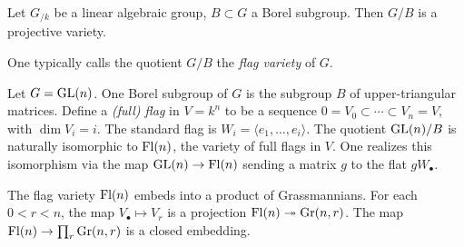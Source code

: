 \begin{theorem}
Let $G_{/k}$ be a linear algebraic group, $B\subset G$ a Borel subgroup. Then 
$G/B$ is a projective variety. 
\end{theorem}

One typically calls the quotient $G/B$ the \emph{flag variety} of $G$. 

\begin{example}
Let $G=\operatorname{GL}(n)$. One Borel subgroup of $G$ is the subgroup $B$ of 
upper-triangular matrices. Define a \emph{(full) flag} in $V=k^n$ to be a 
sequence $0=V_0\subset \cdots \subset V_n=V$, with $\dim V_i=i$. The 
standard flag is $W_i=\langle e_1,\dots,e_i\rangle$. The quotient 
$\operatorname{GL}(n)/B$ is naturally isomorphic to $\operatorname{Fl}(n)$, the variety of full flags 
in $V$. One realizes this isomorphism via the map $\operatorname{GL}(n)\to \operatorname{Fl}(n)$ sending 
a matrix $g$ to the flat $g W_\bullet$. 

The flag variety $\operatorname{Fl}(n)$ embeds into a product of Grassmannians. For each 
$0< r< n$, the map $V_\bullet\mapsto V_r$ is a projection 
$\operatorname{Fl}(n) \twoheadrightarrow \operatorname{Gr}(n,r)$. The map 
$\operatorname{Fl}(n)\to \prod_r \operatorname{Gr}(n,r)$ is a closed embedding. 
\end{example}




